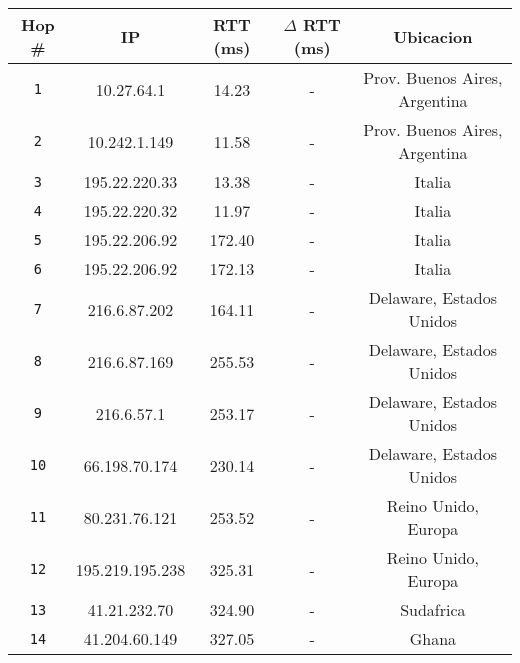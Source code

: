 \begin{table}[ht]\begin{center}
    \begin{tabular}{|c|c|c|c|c|}
    \hline
    \textbf{Hop \#} & \textbf{IP} & \textbf{RTT (ms)} & \textbf{$\Delta$ RTT (ms)} & \textbf{Ubicacion}             \\ \hline
    \texttt{1}  & 10.27.64.1      & 14.23             & -                          & Prov. Buenos Aires, Argentina  \\ \hline
    \texttt{2}  & 10.242.1.149    & 11.58             & -                          & Prov. Buenos Aires, Argentina  \\ \hline
    \texttt{3}  & 195.22.220.33   & 13.38             & -                          & Italia                         \\ \hline
    \texttt{4}  & 195.22.220.32   & 11.97             & -                          & Italia                         \\ \hline
    \texttt{5}  & 195.22.206.92   & 172.40            & -                          & Italia                         \\ \hline
    \texttt{6}  & 195.22.206.92   & 172.13            & -                          & Italia                         \\ \hline
    \texttt{7}  & 216.6.87.202    & 164.11            & -                          & Delaware, Estados Unidos       \\ \hline
    \texttt{8}  & 216.6.87.169    & 255.53            & -                          & Delaware, Estados Unidos       \\ \hline
    \texttt{9}  & 216.6.57.1      & 253.17            & -                          & Delaware, Estados Unidos       \\ \hline
    \texttt{10} & 66.198.70.174   & 230.14            & -                          & Delaware, Estados Unidos       \\ \hline
    \texttt{11} & 80.231.76.121   & 253.52            & -                          & Reino Unido, Europa            \\ \hline
    \texttt{12} & 195.219.195.238 & 325.31            & -                          & Reino Unido, Europa            \\ \hline
    \texttt{13} & 41.21.232.70    & 324.90            & -                          & Sudafrica                      \\ \hline
    \texttt{14} & 41.204.60.149   & 327.05            & -                          & Ghana                          \\ \hline

\end{tabular}
\end{center}
\end{table}
